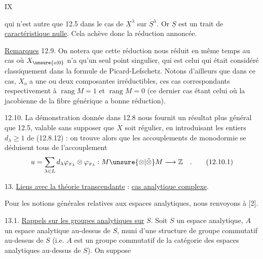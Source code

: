 \hfill IX

qui n'est autre que 12.5 dans le cas de $\underline X^\lambda$ sur $\underline S^\lambda$. Or $\underline S$ est un trait de \uline{caractéristique nulle}. Cela achève donc la réduction annoncée.

\uline{Remarques} 12.9. On notera que cette réduction nous réduit en même temps au cas où $X_{\unsure{o|0}}$ n'a qu'un seul point singulier, qui est celui qui était considéré classiquement dans la formule de Picard-Lefschetz. Notons d'ailleurs que dans ce cas, $X_o$ a une ou deux composantes irréductibles, ces cas correspondants respectivement à $\operatorname{rang} M=1$ et $\operatorname{rang} M=0$ (ce dernier cas étant celui où la jacobienne de la fibre générique a bonne réduction).

12.10. La démonstration donnée dans 12.8 nous fournit un résultat plus général que 12.5, valable sans supposer que $X$ soit régulier, en introduisant les entiers $d_\lambda\geq1$ de (12.8.12) : on trouve alors que les accouplements de monodormie se déduisent tous de l'accouplement
\[
 u=\sum_{\lambda\in L}d_\lambda\varphi_{x_\lambda}\otimes\varphi_{x_\lambda}:M\unsure{\otimes|\hat\otimes}M\longrightarrow\mathbb Z\quad.
 \tag*{(12.10.1)}
\]

13. \uline{Liens avec la théorie transcendante} : \uline{cas analytique complexe}.

Pour les notions générales relatives aux espaces analytiques, nous renvoyons à [2].

13.1. \uline{Rappels sur les groupes analytiques sur} $S$. Soit $S$ un espace analytique, $A$ un espace analytique au-dessus de $S$, muni d'une structure de groupe commutatif au-dessus de $S$ (i.e. $A$ est un groupe commutatif de la catégorie des espaces analytiques au-dessus de $S$). On suppose
